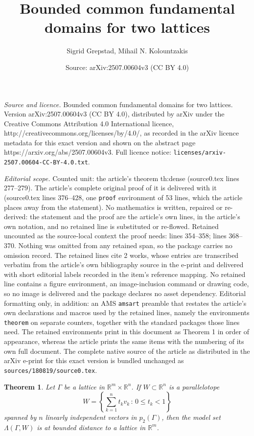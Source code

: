\documentclass[10pt,a4paper]{amsart}
\title{Bounded common fundamental domains for two lattices}
\author{Sigrid Grepstad, Mihail N. Kolountzakis}
\date{Source: arXiv:2507.00604v3 (CC BY 4.0)}
\newtheorem{theorem}{Theorem}
\begin{document}
\maketitle

\noindent\emph{Source and licence.} Bounded common fundamental domains for two lattices. Version arXiv:2507.00604v3 (CC BY 4.0), distributed by arXiv under the Creative Commons Attribution 4.0 International licence, http://creativecommons.org/licenses/by/4.0/, as recorded in the arXiv licence metadata for this exact version and shown on the abstract page https://arxiv.org/abs/2507.00604v3. Full licence notice: \texttt{licenses/arxiv-2507.00604-CC-BY-4.0.txt}.\par\smallskip

\noindent\textit{Editorial scope.} Counted unit: the article's theorem th:dense (source0.tex lines 277--279). The article's complete original proof of it is delivered with it (source0.tex lines 376--428, one \texttt{proof} environment of 53 lines, which the article places away from the statement). No mathematics is written, repaired or re-derived: the statement and the proof are the article's own lines, in the article's own notation, and no retained line is substituted or re-flowed.  Retained uncounted as the source-local context the proof needs: lines 354--358; lines 368--370.  Nothing was omitted from any retained span, so the package carries no omission record.  The retained lines cite 2 works, whose entries are transcribed verbatim from the article's own bibliography source in the e-print and delivered with short editorial labels recorded in the item's reference mapping.  No retained line contains a figure environment, an image-inclusion command or drawing code, so no image is delivered and the package declares no asset dependency.  Editorial formatting only, in addition: an AMS \texttt{amsart} preamble that restates the article's own declarations and macros used by the retained lines, namely the environments \texttt{theorem} on separate counters, together with the standard packages those lines need.  The retained environments print in this document as Theorem 1 in order of appearance, whereas the article prints the same items with the numbering of its own full document.  The complete native source of the article as distributed in the arXiv e-print for this exact version is bundled unchanged as \texttt{sources/180819/source0.tex}.
\begin{theorem}{\cite[Theorem 3.1]{DO1991}}\label{thm:do}
Let $\Gamma$ be a lattice in $\mathbb{R}^m \times \mathbb{R}^n$. If $W \subset \mathbb{R}^n$ is a parallelotope
\[W= \left\{ \sum_{k=1}^n t_k v_k \, : \, 0 \leq t_k < 1 \right\}\]
spanned by $n$ linearly independent vectors in $p_2(\Gamma)$, then the model set $\Lambda(\Gamma, W)$ is at bounded distance to a lattice in $\mathbb{R}^m$.
\end{theorem}
\end{document}
